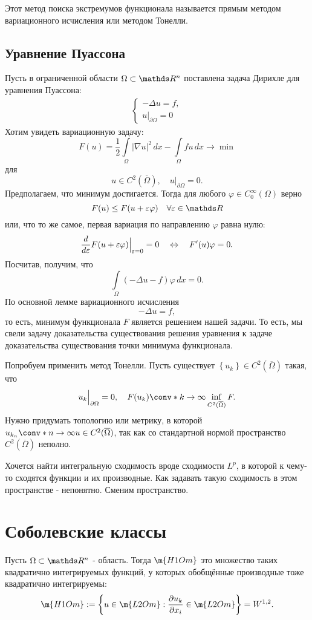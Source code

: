 Этот метод поиска экстремумов функционала называется прямым методом вариационного исчисления или методом Тонелли.

\subsection{Уравнение Пуассона}

Пусть в ограниченной области $\Omega \subset \real^n$ поставлена задача Дирихле для уравнения Пуассона:
\begin{align*}
	\begin{cases*}
		- \Delta u =f, \\
		u\Big\rvert_{\partial \Omega} = 0
	\end{cases*}
\end{align*} 
Хотим увидеть вариационную задачу:
$$ F(u) = \frac {1} {2} \int \limits_\Omega | \nabla u |^2 \, dx - \int \limits_\Omega fu \, dx \rightarrow \min$$ для
$$ u \in C^2(\overline{\Omega}), \quad u\Big\rvert_{\partial \Omega}=0.$$
Предполагаем, что минимум достигается. Тогда для любого $\varphi \in C_0^\infty (\Omega)$ верно
$$F(u) \leq F(u + \eps \varphi) \quad \forall \eps \in \real$$
или, что то же самое, первая вариация по направлению $\varphi$ равна нулю:
$$ \frac {d} {d \varepsilon} F(u + \varepsilon \varphi)\Big\rvert_{\varepsilon=0} = 0 \quad \Leftrightarrow \quad F'(u) \varphi = 0.$$
Посчитав, получим, что $$ \int \limits_\Omega (- \Delta u - f) \varphi \, dx = 0.$$
По основной лемме вариационного исчисления
$$ - \Delta u = f,$$
то есть, минимум функционала $F$ является решением нашей задачи. То есть, мы свели задачу доказательства существования решения уравнения к задаче доказательства существования точки минимума функционала.

Попробуем применить метод Тонелли. Пусть существует $\left\{ u_k \right\} \in C^2(\overline{\Omega})$ такая, что
$$ u_k\Big\rvert_{\partial \Omega} = 0, \quad F(u_k) \conv* {} {k \to \infty} \inf_{C^2(\overline{\Omega})} F.$$
Нужно придумать топологию или метрику, в которой $u_{k_n} \conv*{}{n \to \infty} u \in C^2(\overline{\Omega})$, так как со стандартной нормой пространство $C^2(\overline{\Omega})$ неполно.

Хочется найти интегральную сходимость вроде сходимости $L^p$, в которой к чему-то сходятся функции и их производные. Как задавать такую сходимость в этом пространстве - непонятно. Сменим пространство.

\section{Соболевcкие классы}
\begin{definition} Пусть $\Omega \subset \real^n$ - область. Тогда $\m{H1Om}$ это множество таких квадратично интегрируемых функций, у которых обобщённые производные тоже квадратично интегрируемы:
	$$\m{H1Om}:= \left\{ u \in \m{L2Om}: \pder[u_k]{x_i} \in \m{L2Om} \right\} = W^{1,2}.$$
\end{definition}


